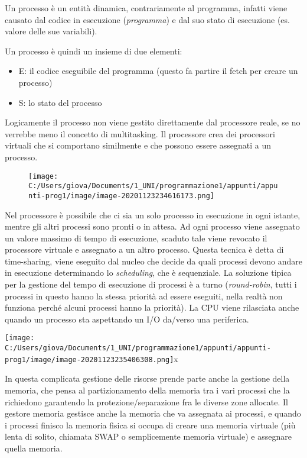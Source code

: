 \documentclass[
]{article}
\begin{document}
Un processo è un entità dinamica, contrariamente al programma, infatti
viene causato dal codice in esecuzione (\emph{programma}) e dal suo
stato di esecuzione (es. valore delle sue variabili).

Un processo è quindi un insieme di due elementi:

\begin{itemize}
\item
  E: il codice eseguibile del programma (questo fa partire il fetch per
  creare un processo)
\item
  S: lo stato del processo
\end{itemize}

Logicamente il processo non viene gestito direttamente dal processore
reale, se no verrebbe meno il concetto di multitasking. Il processore
crea dei processori virtuali che si comportano similmente e che possono
essere assegnati a un processo.

\begin{figure}
\centering
\texttt{[image: C:/Users/giova/Documents/1\_UNI/programmazione1/appunti/appunti-prog1/image/image-20201123234616173.png]}
\caption{}
\end{figure}

Nel processore è possibile che ci sia un solo processo in esecuzione in
ogni istante, mentre gli altri processi sono pronti o in attesa. Ad ogni
processo viene assegnato un valore massimo di tempo di esecuzione,
scaduto tale viene revocato il processore virtuale e assegnato a un
altro processo. Questa tecnica è detta di time-sharing, viene eseguito
dal nucleo che decide da quali processi devono andare in esecuzione
determinando lo \emph{scheduling}, che è sequenziale. La soluzione
tipica per la gestione del tempo di esecuzione di processi è a turno
(\emph{round-robin}, tutti i processi in questo hanno la stessa priorità
ad essere eseguiti, nella realtà non funziona perché alcuni processi
hanno la priorità). La CPU viene rilasciata anche quando un processo sta
aspettando un I/O da/verso una periferica.

\texttt{[image: C:/Users/giova/Documents/1\_UNI/programmazione1/appunti/appunti-prog1/image/image-20201123235406308.png]}x

In questa complicata gestione delle risorse prende parte anche la
gestione della memoria, che pensa al partizionamento della memoria tra i
vari processi che la richiedono garantendo la protezione/separazione fra
le diverse zone allocate. Il gestore memoria gestisce anche la memoria
che va assegnata ai processi, e quando i processi finisco la memoria
fisica si occupa di creare una memoria virtuale (più lenta di solito,
chiamata SWAP o semplicemente memoria virtuale) e assegnare quella
memoria.
\end{document}

